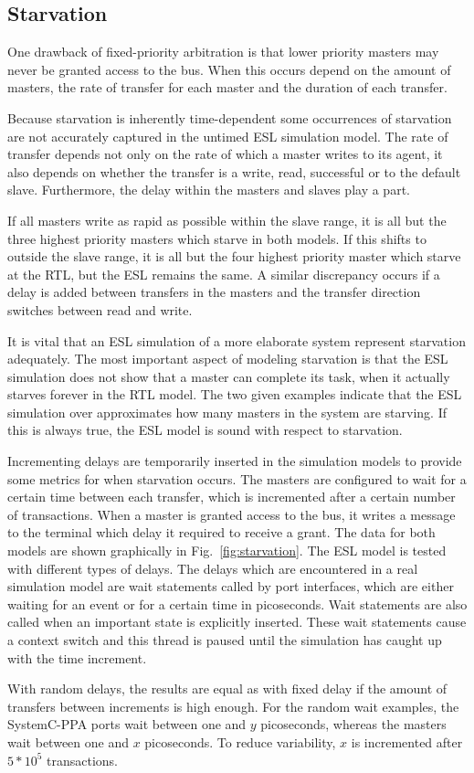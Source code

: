 \subsection{Starvation}
\label{sub:starvation}
One drawback of fixed-priority arbitration is that lower priority masters may never be granted access to the bus. When this occurs depend on the amount of masters, the rate of transfer for each master and the duration of each transfer. \par
Because starvation is inherently time-dependent some occurrences of starvation are not accurately captured in the untimed ESL simulation model. The rate of transfer depends not only on the rate of which a master writes to its agent, it also depends on whether the transfer is a write, read, successful or to the default slave. Furthermore, the delay within the masters and slaves play a part. \par
If all masters write as rapid as possible within the slave range, it is all but the three highest priority masters which starve in both models. If this shifts to outside the slave range, it is all but the four highest priority master which starve at the RTL, but the ESL remains the same. A similar discrepancy occurs if a delay is added between transfers in the masters and the transfer direction switches between read and write. \par
It is vital that an ESL simulation of a more elaborate system represent starvation adequately. The most important aspect of modeling starvation is that the ESL simulation does not show that a master can complete its task, when it actually starves forever in the RTL model. The two given examples indicate that the ESL simulation over approximates how many masters in the system are starving. If this is always true, the ESL model is sound with respect to starvation. \par
Incrementing delays are temporarily inserted in the simulation models to provide some metrics for when starvation occurs. The masters are configured to wait for a certain time between each transfer, which is incremented after a certain number of transactions. When a master is granted access to the bus, it writes a message to the terminal which delay it required to receive a grant. The data for both models are shown graphically in Fig.~\ref{fig:starvation}. The ESL model is tested with different types of delays. The delays which are encountered in a real simulation model are wait statements called by port interfaces, which are either waiting for an event or for a certain time in picoseconds. Wait statements are also called when an important state is explicitly inserted. These wait statements cause a context switch and this thread is paused until the simulation has caught up with the time increment. \par
With random delays, the results are equal as with fixed delay if the amount of transfers between increments is high enough. For the random wait examples, the SystemC-PPA ports wait between one and $y$ picoseconds, whereas the masters wait between one and $x$ picoseconds. To reduce variability, $x$ is incremented after $5*10^5$ transactions.      

